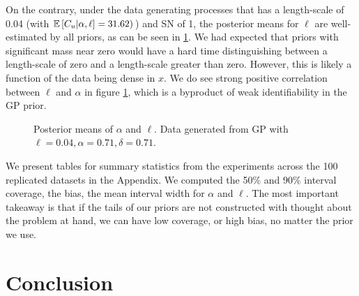 \documentclass{article}
\newcommand{\Exp}[1]{\ensuremath{\mathbb{E} \lb #1 \rb}}
\newcommand{\lb}{\ensuremath{\left[}}
\newcommand{\rb}{\ensuremath{\right]}}
\begin{document}
On the contrary, under the data generating processes that has a length-scale of
0.04 (with $\Exp{C_u | \alpha, \ell} = 31.62)$) and SN of 1, the posterior
means for $\ell$ are well-estimated by all priors, as can be seen in
\ref{joint_len_alpha_high_SN}. We had expected that priors with significant
mass near zero would have a hard time distinguishing between a length-scale of
zero and a length-scale greater than zero. However, this is likely a function
of the data being dense in $x$. We do see strong positive correlation between
$\ell$ and $\alpha$ in figure \ref{joint_len_alpha_high_SN}, which is a
byproduct of weak identifiability in the GP prior.
\begin{figure}[htbp]
  \centering
  \caption{Posterior means of $\alpha$ and $\ell$. Data generated from GP with $\ell = 0.04, \alpha = 0.71, \delta = 0.71$.} \label{joint_len_alpha_high_SN}
\end{figure}

We present tables for summary statistics from the experiments across the 100
replicated datasets in the Appendix. We computed the 50\% and 90\% interval
coverage, the bias, the mean interval width for $\alpha$ and $\ell$. The most
important takeaway is that if the tails of our priors are not constructed with
thought about the problem at hand, we can have low coverage, or high bias, no
matter the prior we use. 

\section{Conclusion}
\end{document}
